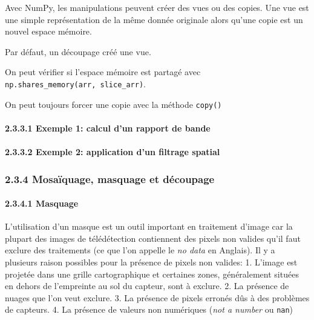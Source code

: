 \documentclass[
]{article}
\begin{document}
Avec NumPy, les manipulations peuvent créer des vues ou des copies. Une
vue est une simple représentation de la même donnée originale alors
qu'une copie est un nouvel espace mémoire.

Par défaut, un découpage créé une vue.

On peut vérifier si l'espace mémoire est partagé avec
\texttt{np.shares\_memory(arr,\ slice\_arr)}.

On peut toujours forcer une copie avec la méthode \texttt{copy()}

\paragraph{\texorpdfstring{{2.3.3.1} Exemple 1: calcul d'un rapport de
bande}{2.3.3.1 Exemple 1: calcul d'un rapport de bande}}\label{exemple-1-calcul-dun-rapport-de-bande}

\paragraph{\texorpdfstring{{2.3.3.2} Exemple 2: application d'un
filtrage
spatial}{2.3.3.2 Exemple 2: application d'un filtrage spatial}}\label{exemple-2-application-dun-filtrage-spatial}

\subsubsection{\texorpdfstring{{2.3.4} Mosaïquage, masquage et
découpage}{2.3.4 Mosaïquage, masquage et découpage}}\label{mosauxefquage-masquage-et-duxe9coupage}

\paragraph{\texorpdfstring{{2.3.4.1}
Masquage}{2.3.4.1 Masquage}}\label{masquage}

L'utilisation d'un masque est un outil important en traitement d'image
car la plupart des images de télédétection contiennent des pixels non
valides qu'il faut exclure des traitements (ce que l'on appelle le
\emph{no data} en Anglais). Il y a plusieurs raison possibles pour la
présence de pixels non valides: 1. L'image est projetée dans une grille
cartographique et certaines zones, généralement situées en dehors de
l'empreinte au sol du capteur, sont à exclure. 2. La présence de nuages
que l'on veut exclure. 3. La présence de pixels erronés dûs à des
problèmes de capteurs. 4. La présence de valeurs non numériques
(\emph{not a number} ou \texttt{nan})
\end{document}
